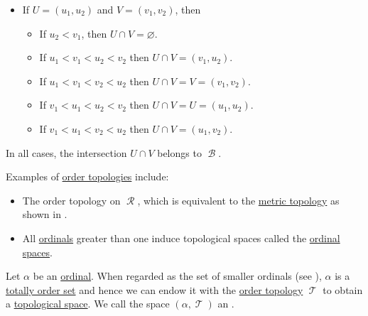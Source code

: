 \begin{defproof}
\begin{itemize}
    \item If \( U = (u_1, u_2) \) and \( V = (v_1, v_2) \), then
    \begin{itemize}
      \item If \( u_2 < v_1 \), then \( U \cap V = \varnothing \).
      \item If \( u_1 < v_1 < u_2 < v_2 \) then \( U \cap V = (v_1, u_2) \).
      \item If \( u_1 < v_1 < v_2 < u_2 \) then \( U \cap V = V = (v_1, v_2) \).
      \item If \( v_1 < u_1 < u_2 < v_2 \) then \( U \cap V = U = (u_1, u_2) \).
      \item If \( v_1 < u_1 < v_2 < u_2 \) then \( U \cap V = (u_1, v_2) \).
    \end{itemize}
  \end{itemize}

  In all cases, the intersection \( U \cap V \) belongs to \( \mscrB \).
\end{defproof}

\begin{example}\label{ex:def:order_topology}
  Examples of \hyperref[def:order topology]{order topologies} include:
  \begin{itemize}
    \item The order topology on \( \mscrR \), which is equivalent to the \hyperref[def:metric_topology]{metric topology} as shown in .

    \item All \hyperref[def:ordinal]{ordinals} greater than one induce topological spaces called the \hyperref[def:ordinal_space]{ordinal spaces}.
  \end{itemize}
\end{example}

\begin{definition}\label{def:ordinal_space}
  Let \( \alpha \) be an \hyperref[def:ordinal]{ordinal}. When regarded as the set of smaller ordinals (see ), \( \alpha \) is a \hyperref[def:totally_ordered_set]{totally order set} and hence we can endow it with the \hyperref[def:order_topology]{order topology} \( \mscrT \) to obtain a \hyperref[def:topological_space]{topological space}. We call the space \( (\alpha, \mscrT) \) an .
\end{definition}

